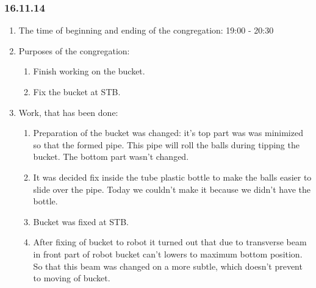 
\subsubsection{16.11.14}

\begin{enumerate} 
	\item The time of beginning and ending of the congregation:
	19:00 - 20:30
	\item Purposes of the congregation:
	\begin{enumerate}
		\item Finish working on the bucket.
		
		\item Fix the bucket at STB.
		
	\end{enumerate}
	
	\item Work, that has been done:
	\begin{enumerate}
		\item Preparation of the bucket was changed: it's top part was was minimized so that the formed pipe. This pipe will roll the balls during tipping the bucket. The bottom part wasn't changed.
		
		\item It was decided fix inside the tube plastic bottle to make the balls easier to slide over the pipe. Today we couldn't make it because we didn't have the bottle.
		
		\item Bucket was fixed at STB.
		
		\item After fixing of bucket to robot it turned out that due to transverse beam in front part of robot bucket can't lowers to maximum bottom position. So that this beam was changed on a more subtle, which doesn't prevent to moving of bucket.
		

\end{enumerate}
\end{enumerate}
